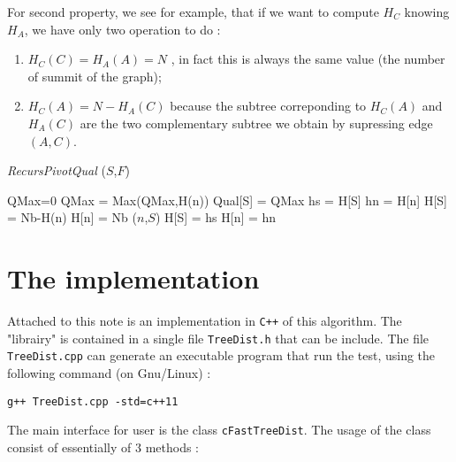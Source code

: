 \documentclass[a4paper]{article}
\begin{document}
For second property, we see for example, that if we want to compute $H_C$ knowing
$H_A$, we have only two operation to do :


\begin{enumerate}
  \item   $H_C(C) = H_A(A) = N$ , in  fact this is always the same value (the number of summit of the graph);
  \item   $H_C(A) = N-H_A(C)$  because the subtree correponding to $H_C(A)$ and $H_A(C)$ are the
          two complementary subtree we obtain by supressing edge $(A,C)$.
\end{enumerate}


\begin{algorithm}
\caption{{\it RecursPivotQual} ($S$,$F$)  }
\begin{algorithmic}
     \STATE {}
     \STATE QMax=0  
              \STATE QMax = Max(QMax,H(n))
     \ENDFOR
     \STATE Qual[S] = QMax
     \STATE {}
              \STATE {}
              \STATE hs = H[S]
              \STATE hn = H[n]
              \STATE H[S] = Nb-H(n)
              \STATE H[n] = Nb
              ($n$,$S$)
              \STATE {}
              \STATE H[S] = hs
              \STATE H[n] = hn
     \ENDFOR
\end{algorithmic}
\label{AlgoRecPivot}
\end{algorithm}

\section{The implementation}

Attached to this note is an implementation in {\tt C++} of this algorithm.
The "librairy" is contained in a single file {\tt TreeDist.h} that can be include.
The file {\tt TreeDist.cpp} can generate an executable program that run the test,
using the following command (on Gnu/Linux) :

{\tt g++ TreeDist.cpp  -std=c++11}


The main interface for user is the class {\tt cFastTreeDist}. The usage of the class
consist of essentially of $3$ methods :
\end{document}
